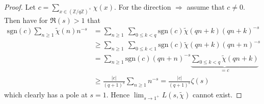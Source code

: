 \documentclass{scrartcl}
\newcommand{\Z}{\mathbb{Z}}
\newcommand{\units}{\times}
\newcommand{\sgn}{\mathrm{sgn}}
\begin{document}
\begin{proof}
    Let $c = \sum_{x \in (\Z/q\Z)^\units} \chi(x)$.
    For the direction $\Rightarrow$ assume that $c \neq 0$.
    Then have for $\Re(s) > 1$ that
    \begin{align*}
        \sgn(c) \sum_{n \geq 1} \tilde{\chi}(n) n^{-s} &= \sum_{n \geq 1} \ \sum_{0 \leq k < q} \sgn(c) \tilde{\chi}(qn + k) (qn + k)^{-s} \\
        &\geq \sum_{n \geq 1} \ \sum_{0 \leq k < 1}\sgn(c) \tilde{\chi}(qn + k) (qn + n)^{-s} \\
        &= \sum_{n \geq 1} \sgn(c) (qn + n)^{-s} \underbrace{\sum_{0 \leq k < q} \tilde{\chi}(qn + k)}_{= c} \\
        &\geq \frac {|c|} {(q + 1)^s} \sum_{n \geq 1} n^{-s} = \frac {|c|} {(q + 1)^s} \zeta(s)
    \end{align*}
    which clearly has a pole at $s = 1$. Hence $\lim_{s \to 1^+} L(s, \tilde{\chi})$ cannot exist.


\end{proof}
\end{document}
